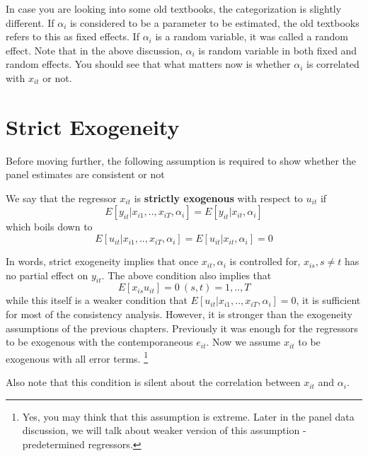 In case you are looking into some old textbooks, the categorization is slightly different. If $\alpha_i$ is considered to be a parameter to be estimated, the old textbooks refers to this as fixed effects. If $\alpha_i$ is a random variable, it was called a random effect. Note that in the above discussion, $\alpha_i$ is random variable in both fixed and random effects. You should see that what matters now is whether $\alpha_i$ is correlated with $x_{it}$ or not. \par
\section{Strict Exogeneity}
Before moving further, the following assumption is required to show whether the panel estimates are consistent or not
\begin{mdframed}[backgroundcolor=blue!5] 
\begin{assumption} We say that the regressor $x_{it}$ is \textbf{strictly exogenous} with respect to $u_{it}$ if
\[
E[y_{it}|x_{i1},..,x_{iT},\alpha_i]=E[y_{it}|x_{it},\alpha_i]
\]
which boils down to
\[
E[u_{it}|x_{i1},..,x_{iT},\alpha_i]=E[u_{it}|x_{it},\alpha_i]=0
\]
\end{assumption}
\end{mdframed} \par
In words, strict exogeneity implies that once $x_{it}, \alpha_i$ is controlled for, $x_{is}, s\neq t$ has no partial effect on $y_{it}$. The above condition also implies that 
\[
E[x_{is}u_{it}]=0 \ (s,t)=1,..,T
\]
while this itself is a weaker condition that $E[u_{it}|x_{i1},..,x_{iT},\alpha_i]=0$, it is sufficient for most of the consistency analysis. However, it is stronger than the exogeneity assumptions of the previous chapters. Previously it was enough for the regressors to be exogenous with the contemporaneous $e_{it}$. Now we assume $x_{it}$ to be exogenous with all error terms. \footnote{Yes, you may think that this assumption is extreme. Later in the panel data discussion, we will talk about weaker version of this assumption - predetermined regressors. }\par
Also note that this condition is silent about the correlation between $x_{it}$ and $\alpha_i$. 
